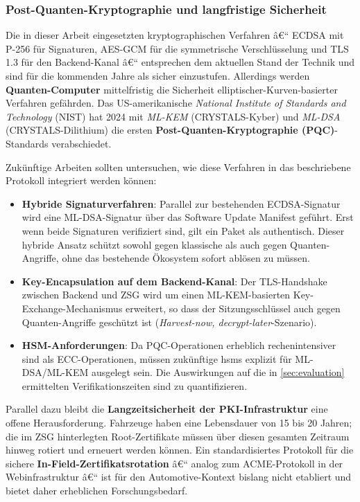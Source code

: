 ﻿\documentclass[12pt,a4paper,twoside]{article}
\begin{document}
\subsubsection{Post-Quanten-Kryptographie und langfristige Sicherheit}

Die in dieser Arbeit eingesetzten kryptographischen Verfahren â€“
ECDSA mit P-256 für Signaturen, AES-GCM für die symmetrische
Verschlüsselung und TLS\,1.3 für den Backend-Kanal â€“ entsprechen dem
aktuellen Stand der Technik und sind für die kommenden Jahre als sicher
einzustufen. Allerdings werden \textbf{Quanten-Computer} mittelfristig
die Sicherheit elliptischer-Kurven-basierter Verfahren gefährden.
Das US-amerikanische \textit{National Institute of Standards and
Technology} (NIST) hat 2024 mit \textit{ML-KEM} (CRYSTALS-Kyber)
und \textit{ML-DSA} (CRYSTALS-Dilithium) die ersten
\textbf{Post-Quanten-Kryptographie (PQC)}-Standards verabschiedet.

Zukünftige Arbeiten sollten untersuchen, wie diese Verfahren in das
beschriebene Protokoll integriert werden können:
\begin{itemize}
  \item \textbf{Hybride Signaturverfahren}: Parallel zur bestehenden
    ECDSA-Signatur wird eine ML-DSA-Signatur über das Software Update
    Manifest geführt. Erst wenn beide Signaturen verifiziert sind, gilt
    ein Paket als authentisch. Dieser hybride Ansatz schützt sowohl
    gegen klassische als auch gegen Quanten-Angriffe,
    ohne das bestehende Ökosystem sofort ablösen zu müssen.
  \item \textbf{Key-Encapsulation auf dem Backend-Kanal}:
    Der TLS-Handshake zwischen Backend und ZSG wird um einen
    ML-KEM-basierten Key-Exchange-Mechanismus erweitert,
    so dass der Sitzungsschlüssel auch gegen Quanten-Angriffe
    geschützt ist (\textit{Harvest-now, decrypt-later}-Szenario).
  \item \textbf{HSM-Anforderungen}: Da PQC-Operationen erheblich
    rechenintensiver sind als ECC-Operationen, müssen zukünftige
    \glspl{hsm} explizit für ML-DSA/ML-KEM ausgelegt sein.
    Die Auswirkungen auf die in \cref{sec:evaluation} ermittelten
    Verifikationszeiten sind zu quantifizieren.
\end{itemize}

Parallel dazu bleibt die \textbf{Langzeitsicherheit der
PKI-Infrastruktur} eine offene Herausforderung. Fahrzeuge haben
eine Lebensdauer von 15 bis 20 Jahren; die im ZSG hinterlegten
Root-Zertifikate müssen über diesen gesamten Zeitraum hinweg
rotiert und erneuert werden können. Ein standardisiertes Protokoll
für die sichere \textbf{In-Field-Zertifikatsrotation} â€“
analog zum ACME-Protokoll in der Webinfrastruktur â€“ ist für
den Automotive-Kontext bislang nicht etabliert und bietet
daher erheblichen Forschungsbedarf.
\end{document}
